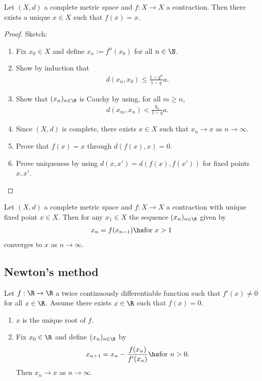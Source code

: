 \documentclass{article}
\begin{document}
\begin{theorem}
	Let $(X,d)$ a complete metric space and $f:X\to X$ a contraction. Then there exists a
	unique $x\in X$ such that $f(x)=x$.
	\begin{proof}
		Sketch:
		\begin{enumerate}
			\item Fix $x_0\in X$ and define $x_n:= f^n(x_0)$ for all $n\in\N$.
			\item Show by induction that \begin{align*}
				      d(x_n,x_0)\leq \frac{1-q^n}{1-q}a.
			      \end{align*}
			\item Show that $(x_n)_{n\in\N}$ is Cauchy by using, for all $m\geq n$, \begin{align*}
				      d(x_m,x_n)<\frac{q_n}{1-q}a.
			      \end{align*}
			\item Since $(X,d)$ is complete, there exists $x\in X$ such that $x_n\to x$ as $n\to\infty$.
			\item Prove that $f(x)=x$ through $d(f(x),x)=0$.
			\item Prove uniqueness by using $d(x,x')=d(f(x),f(x'))$ for fixed points $x,x'$.
		\end{enumerate}
	\end{proof}
\end{theorem}

\begin{theorem}
	Let $(X,d)$ a complete metric space and $f:X\to X$ a contraction with unique fixed
	point $x\in X$. Then for any $x_1\in X$ the sequence $(x_n)_{n\in\N}$ given by
	\begin{align*}
		x_n = f(x_{n-1}) \hs\text{for $x>1$}
	\end{align*}
	converges to $x$ as $n\to\infty$.
\end{theorem}

\subsection{Newton's method}

\begin{proposition}[Newton]
	Let $f:\R\to\R$ a twice continuously differentiable function such that $f'(x)\neq 0$
	for all $x\in\R$. Assume there exists $x\in\R$ such that $f(x)=0$.
	\begin{enumerate}
		\item $x$ is the unique root of $f$.
		\item Fix $x_0\in\R$ and define $(x_n)_{n\in\N}$ by \begin{align*}
			      x_{n+1} = x_n - \frac{f(x_n)}{f'(x_n)} \hs\text{for $n>0$}.
		      \end{align*}
		      Then $x_n\to x$ as $n\to\infty$.
	\end{enumerate}

\end{proposition}
\end{document}

